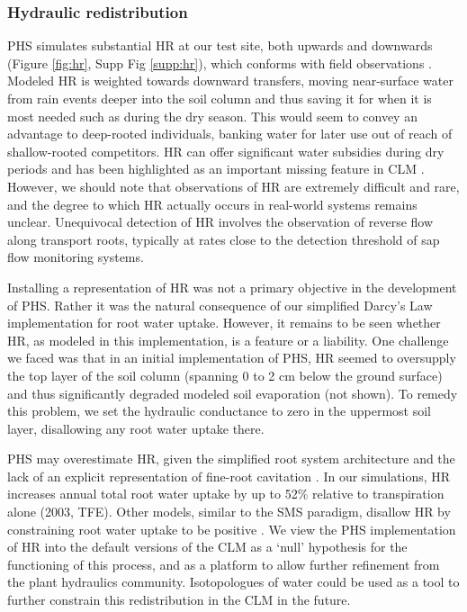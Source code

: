 \documentclass[draft,linenumbers]{agujournal}
\begin{document}
\subsubsection{Hydraulic redistribution}
PHS simulates substantial HR at our test site, both upwards and downwards (Figure \ref{fig:hr}, Supp Fig \ref{supp:hr}), which conforms with field observations \citep{burgess1998,oliveira2005}.
    Modeled HR is weighted towards downward transfers, moving near-surface water from rain events deeper into the soil column and thus saving it for when it is most needed such as during the dry season.
    This would seem to convey an advantage to deep-rooted individuals, banking water for later use out of reach of shallow-rooted competitors.
    HR can offer significant water subsidies during dry periods \citep{jackson2000} and has been highlighted as an important missing feature in CLM \citep{lee2005}. 
    However, we should note that observations of HR are extremely difficult and rare, and the degree to which HR actually occurs in real-world systems remains unclear. 
    Unequivocal detection of HR involves the observation of reverse flow along transport roots, typically at rates close to the detection threshold of sap flow monitoring systems. 
    
    Installing a representation of HR was not a primary objective in the development of PHS.
    Rather it was the natural consequence of our simplified Darcy's Law implementation for root water uptake.
    However, it remains to be seen whether HR, as modeled in this implementation, is a feature or a liability.
    One challenge we faced was that in an initial implementation of PHS, HR seemed to oversupply the top layer of the soil column (spanning 0 to 2 cm below the ground surface) and thus significantly degraded modeled soil evaporation (not shown). 
    To remedy this problem, we set the hydraulic conductance to zero in the uppermost soil layer, disallowing any root water uptake there.
    
    PHS may overestimate HR, given the simplified root system architecture \citep{bouda2017} 
    and the lack of an explicit representation of fine-root cavitation \citep{kotowska2015}.
    In our simulations, HR increases annual total root water uptake by up to 52\% relative to transpiration alone (2003, TFE). 
    Other models, similar to the SMS paradigm, disallow HR by constraining root water uptake to be positive \citep{xu2016}.
    We view the PHS implementation of HR into the default versions of the CLM as a `null' hypothesis for the functioning of this process, and as a platform to allow further refinement from the plant hydraulics community. 
    Isotopologues of water could be used as a tool to further constrain this redistribution in the CLM in the future. 
    
\end{document}
